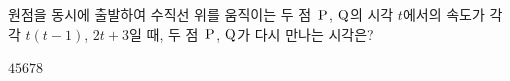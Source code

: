 원점을 동시에 출발하여 수직선 위를 움직이는 두 점~$\mathrm{P}$, $\mathrm{Q}$의 시각 $t$에서의 속도가 각각 $t(t-1)$, $2t+3$일 때, 두 점~$\mathrm{P}$, $\mathrm{Q}$가 다시 만나는 시각은?
\begin{choices32}{$4$}{$5$}{$6$}{$7$}{$8$}\end{choices32}
